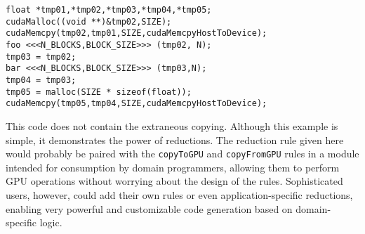 \begin{verbatim}
float *tmp01,*tmp02,*tmp03,*tmp04,*tmp05;
cudaMalloc((void **)&tmp02,SIZE);
cudaMemcpy(tmp02,tmp01,SIZE,cudaMemcpyHostToDevice);
foo <<<N_BLOCKS,BLOCK_SIZE>>> (tmp02, N);
tmp03 = tmp02;
bar <<<N_BLOCKS,BLOCK_SIZE>>> (tmp03,N);
tmp04 = tmp03;
tmp05 = malloc(SIZE * sizeof(float));
cudaMemcpy(tmp05,tmp04,SIZE,cudaMemcpyHostToDevice);
\end{verbatim}

This code does not contain the extraneous copying.  Although this example is simple, it demonstrates the power of reductions. The reduction rule given here would probably be paired with the \texttt{copyToGPU} and \texttt{copyFromGPU} rules in a module intended for consumption by domain programmers, allowing them to perform GPU operations without worrying about the design of the rules. Sophisticated users, however, could add their own rules or even application-specific reductions, enabling very powerful and customizable code generation based on domain-specific logic.
